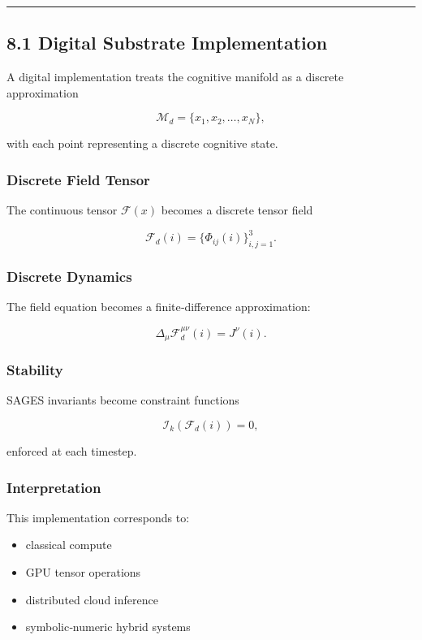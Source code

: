 \begin{center}\rule{0.5\linewidth}{0.5pt}\end{center}

\subsection{8.1 Digital Substrate Implementation}\label{digital-substrate-implementation}

A digital implementation treats the cognitive manifold as a discrete approximation

\[
\mathcal{M}_d = \{x_1, x_2, \dots, x_N\},
\]

with each point representing a discrete cognitive state.

\subsubsection{Discrete Field Tensor}\label{discrete-field-tensor}

The continuous tensor \(\mathcal{F}(x)\) becomes a discrete tensor field

\[
\mathcal{F}_d(i) = \{\Phi_{ij}(i)\}_{i,j=1}^3.
\]

\subsubsection{Discrete Dynamics}\label{discrete-dynamics}

The field equation becomes a finite‑difference approximation:

\[
\Delta_\mu \mathcal{F}_d^{\mu\nu}(i) = J^\nu(i).
\]

\subsubsection{Stability}\label{stability}

SAGES invariants become constraint functions

\[
\mathcal{I}_k(\mathcal{F}_d(i)) = 0,
\]

enforced at each timestep.

\subsubsection{Interpretation}\label{interpretation}

This implementation corresponds to:

\begin{itemize}
\tightlist
\item
  classical compute\\
\item
  GPU tensor operations\\
\item
  distributed cloud inference\\
\item
  symbolic‑numeric hybrid systems
\end{itemize}

